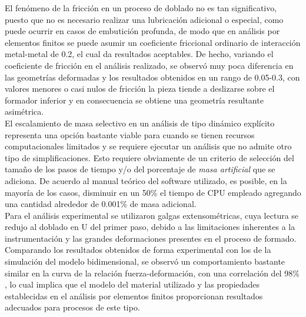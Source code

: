 El fenómeno de la fricción en un proceso de doblado no es tan significativo, puesto que no 
es necesario realizar una lubricación adicional o especial, como puede ocurrir en casos 
de embutición profunda, de modo que en análisis por elementos finitos se puede asumir 
un coeficiente friccional ordinario de interacción metal-metal de 0.2, el cual da resultados 
aceptables. De hecho, variando el coeficiente de fricción en el análisis realizado, se observó 
muy poca diferencia en las geometrías deformadas y los resultados obtenidos en un rango de 0.05-0.3, 
con valores menores o casi nulos de fricción la pieza tiende a deslizarse sobre el formador 
inferior y en consecuencia se obtiene una geometría resultante asimétrica.\\

El escalamiento de masa selectivo en un análisis de tipo dinámico explícito representa una 
opción bastante viable para cuando se tienen recursos computacionales limitados y se 
requiere ejecutar un análisis que no admite otro tipo de simplificaciones. Esto requiere 
obviamente de un criterio de selección del tamaño de los pasos de tiempo y/o del porcentaje 
de \textit{masa artificial} que se adiciona. De acuerdo al manual teórico del software 
utilizado, es posible, en la mayoría de los casos, disminuir en un 50\% el tiempo de CPU 
empleado agregando una cantidad alrededor de 0.001\% de masa adicional.\\

Para el análisis experimental se utilizaron galgas extensométricas, cuya lectura se redujo  
al doblado en U del primer paso, debido a las limitaciones inherentes a la instrumentación y las 
grandes deformaciones presentes en el proceso de formado. Comparando los resultados obtenidos 
de forma experimental con los de la simulación del modelo bidimensional, se observó un comportamiento 
bastante similar en la curva de la relación fuerza-deformación, con una correlación del 98\% , 
lo cual implica que el modelo del material utilizado y las propiedades establecidas en el análisis 
por elementos finitos proporcionan resultados adecuados para procesos de este tipo. 
